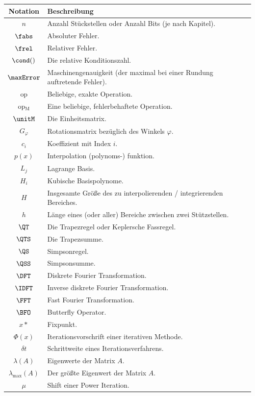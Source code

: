 	\newpage
	\begin{center}
		\begin{tabular}{cp{12cm}}
			\toprule
			Notation						&	Beschreibung\\
			\midrule
			$n$								&	Anzahl Stückstellen oder Anzahl Bits (je nach Kapitel). \\
			$\fabs$							&	Absoluter Fehler. \\
			$\frel$							&	Relativer Fehler. \\
			$\cond()$						&	Die relative Konditionszahl. \\
			$\maxError$						&	Maschinengenauigkeit (der maximal bei einer Rundung auftretende Fehler). \\
			op								&	Beliebige, exakte Operation. \\
			op$_\text{M}$					&	Eine beliebige, fehlerbehaftete Operation. \\
			$\unitM$						&	Die Einheitsmatrix. \\
			$G_\varphi$						&	Rotationsmatrix bezüglich des Winkels $\varphi$. \\
			$c_i$							&	Koeffizient mit Index $i$. \\
			$p(x)$							&	Interpolation (polynoms-) funktion. \\
			$L_j$							&	Lagrange Basis. \\
			$H_i$							&	Kubische Basispolynome. \\
			$H$								& 	Insgesamte Größe des zu interpolierenden / integrierenden Bereiches. \\
			$h$								&	Länge eines (oder aller) Bereiche zwischen zwei Stützstellen. \\
			$\QT$							&	Die Trapezregel oder Keplersche Fassregel. \\
			$\QTS$							&	Die Trapezsumme. \\
			$\QS$							&	Simpsonregel. \\
			$\QSS$							&	Simpsonsumme. \\
			$\DFT$							&	Diskrete Fourier Transformation. \\
			$\IDFT$							&	Inverse diskrete Fourier Transformation. \\
			$\FFT$							&	Fast Fourier Transformation. \\
			$\BFO$							&	Butterfly Operator. \\
			$x*$							&	Fixpunkt. \\
			$\Phi(x)$						&	Iterationsvorschrift einer iterativen Methode. \\
			$\delta t$						&	Schrittweite eines Iterationsverfahrens. \\
			$\lambda(A)$					&	Eigenwerte der Matrix $A$. \\
			$\lambda_{\max}(A)$				&	Der größte Eigenwert der Matrix $A$. \\
			$\mu$							&	Shift einer Power Iteration. \\
			\bottomrule
		\end{tabular}
	\end{center}